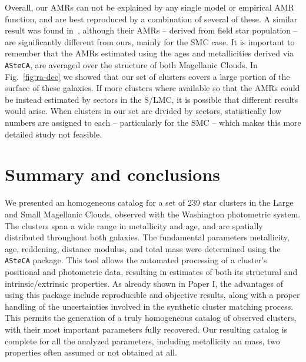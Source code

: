 \documentclass[draft]{aa}
\begin{document}
Overall, our AMRs can not be explained by any single model or empirical AMR
function, and are best reproduced by a combination of several of these. A
similar result was found in~\cite{Piatti_Geisler_2013}, although their AMRs --
derived from field star population -- are significantly different from ours,
mainly for the SMC case.
%
It is important to remember that the AMRs estimated using the ages and
metallicities derived via \texttt{ASteCA}, are averaged over the structure of
both Magellanic Clouds. In Fig.~\ref{fig:ra-dec} we showed that our set of
clusters covers a large portion of the surface of these galaxies.
%
If more clusters where available so that the AMRs could be instead estimated by
sectors in the S/LMC, it is possible that different results would arise. When
clusters in our set are divided by sectors, statistically low numbers are
assigned to each -- particularly for the SMC -- which makes this more detailed
study not feasible.





\section{Summary and conclusions}
\label{sec:summ-concl}

We presented an homogeneous catalog for a set of 239 star clusters in the
Large and Small Magellanic Clouds, observed with the Washington photometric
system. The clusters span a wide range in metallicity and age, and are
spatially distributed throughout both galaxies.
%
The fundamental parameters metallicity, age, reddening, distance modulus, and
total mass were determined using the \texttt{ASteCA} package.
%
This tool allows the automated processing of a cluster's positional and
photometric data, resulting in estimates of both its structural and
intrinsic/extrinsic properties.
%
As already shown in Paper I, the advantages of using this package include
reproducible and objective results, along with a proper handling of the
uncertainties involved in the synthetic cluster matching process.
%
This permits the generation of a truly homogeneous catalog of observed
clusters, with their most important parameters fully recovered.
%
Our resulting catalog is complete for all the analyzed parameters, including
metallicity an mass, two properties often assumed or not obtained at all.
\end{document}
